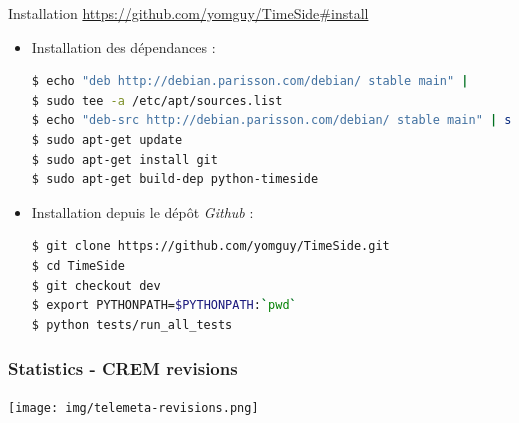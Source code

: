 \documentclass[10pt, final, hyperref, table]{beamer}
\begin{document}
\appendix
\newcommand{\backupbegin}{
   \newcounter{finalframe}
   \setcounter{finalframe}{\value{framenumber}}
}
\newcommand{\backupend}{
   \setcounter{framenumber}{\value{finalframe}}
}
\backupbegin
\begin{frame}[fragile]
  \begin{block}{Installation}
\url{https://github.com/yomguy/TimeSide\#install}
    \begin{itemize}
    \item Installation des dépendances :
\begin{lstlisting}[language=bash, basicstyle=\tiny]
$ echo "deb http://debian.parisson.com/debian/ stable main" |
$ sudo tee -a /etc/apt/sources.list 
$ echo "deb-src http://debian.parisson.com/debian/ stable main" | sudo tee -a /etc/apt/sources.list 
$ sudo apt-get update 
$ sudo apt-get install git 
$ sudo apt-get build-dep python-timeside
\end{lstlisting}

    \item Installation depuis le dépôt \emph{Github} :
\begin{lstlisting}[language=bash, basicstyle=\tiny]
$ git clone https://github.com/yomguy/TimeSide.git 
$ cd TimeSide 
$ git checkout dev 
$ export PYTHONPATH=$PYTHONPATH:`pwd` 
$ python tests/run_all_tests
\end{lstlisting}
\end{itemize}
\end{block}
\end{frame}

\begin{frame}
  \frametitle{Statistics - CREM revisions}
  \begin{center}
    \texttt{[image: img/telemeta-revisions.png]}
  \end{center}
\end{frame}
\end{document}

